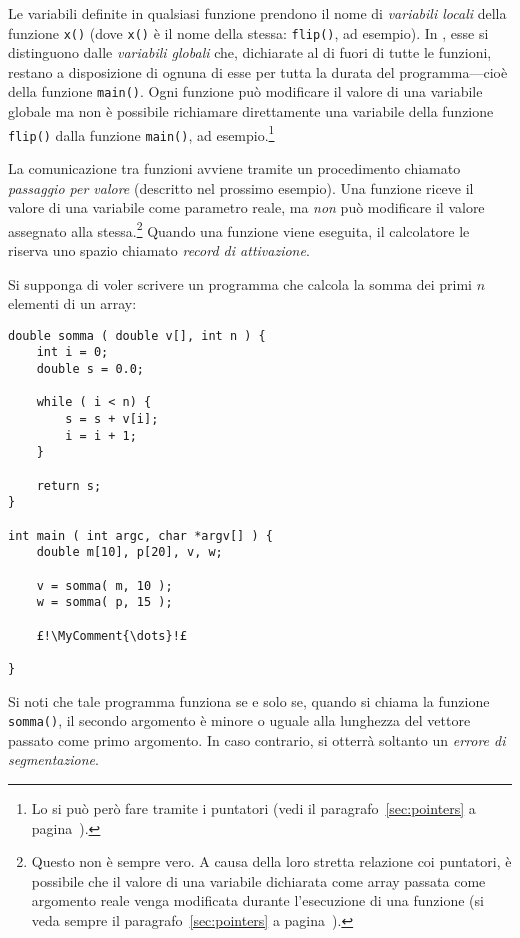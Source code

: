 Le variabili definite in qualsiasi funzione prendono il nome di \emph{variabili locali} della funzione \lstinline!x()! (dove \lstinline!x()! è il nome della stessa: \lstinline!flip()!, ad esempio).
In , esse si distinguono dalle  \emph{variabili globali} che, dichiarate al di fuori di tutte le funzioni, restano a disposizione di ognuna di esse per tutta la durata del programma---cioè della funzione \lstinline!main()!.
Ogni funzione può modificare il valore di una variabile globale ma non è possibile richiamare direttamente una variabile della funzione \lstinline!flip()! dalla funzione \lstinline!main()!, ad esempio.\footnote{Lo si può però fare tramite i puntatori (vedi il paragrafo~\ref{sec:pointers} a pagina~\pageref{sec:pointers}).}

La comunicazione tra funzioni avviene tramite un procedimento chiamato \emph{passaggio per valore} (descritto nel prossimo esempio).
Una funzione riceve il valore di una variabile come parametro reale, ma \emph{non} può modificare il valore assegnato alla stessa.\footnote{Questo non è sempre vero. A causa della loro stretta relazione coi puntatori, è possibile che il valore di una variabile dichiarata come array passata come argomento reale venga modificata durante l'esecuzione di una funzione (si veda sempre il paragrafo~\ref{sec:pointers} a pagina~\pageref{sec:pointers}).}
Quando una funzione viene eseguita, il calcolatore le riserva uno spazio chiamato \emph{record di attivazione}.

Si supponga di voler scrivere un programma che calcola la somma dei primi $n$ elementi di un array:
\begin{lstlisting}
double somma ( double v[], int n ) {
	int i = 0;
	double s = 0.0;

	while ( i < n) {
		s = s + v[i];
		i = i + 1;
	}

	return s;
}

int main ( int argc, char *argv[] ) {
	double m[10], p[20], v, w;

	v = somma( m, 10 );
	w = somma( p, 15 );

	£!\MyComment{\dots}!£

}
\end{lstlisting}
Si noti che tale programma funziona se e solo se, quando si chiama la funzione \lstinline!somma()!, il secondo argomento è minore o uguale alla lunghezza del vettore passato come primo argomento. In caso contrario, si otterrà soltanto un \emph{errore di segmentazione}.


